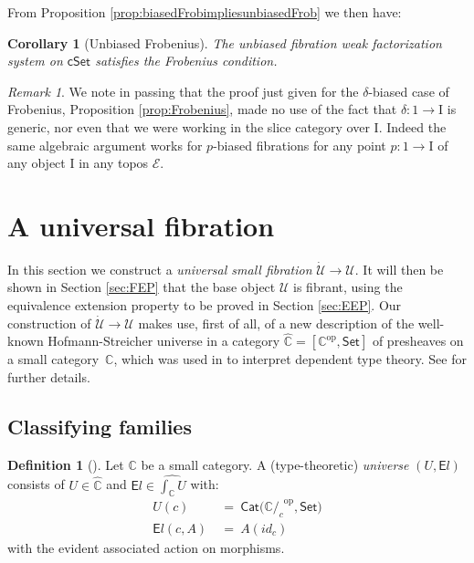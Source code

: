 \documentclass[12pt]{article}
\newcommand{\bbC}{\ensuremath{\mathbb{C}}}
\newcommand{\EE}{\ensuremath{\mathcal{E}}}
\newcommand{\Set}{\ensuremath{\mathsf{Set}}}
\newcommand{\Cat}{\ensuremath{\mathsf{Cat}}}
\newcommand{\cSet}{\ensuremath{\mathsf{cSet}}}
\newcommand{\op}[1]{\ensuremath{{#1}^{\mathrm{op}}}}
\newcommand{\ra}{\ensuremath{\rightarrow}}
\renewcommand{\to}{\ensuremath{\rightarrow}}
\newcommand{\I}{\ensuremath{\mathrm{I}}}
\newcommand{\U}{\ensuremath{\mathcal{U}}}
\newtheorem{corollary}[theorem]{Corollary}
\theoremstyle{remark}
\newtheorem{remark}[theorem]{Remark}
\theoremstyle{definition}
\newtheorem{definition}[theorem]{Definition}
\begin{document}
From Proposition \ref{prop:biasedFrobimpliesunbiasedFrob} we then have:

\begin{corollary}[Unbiased Frobenius]\label{cor:unbiasedFrobenius}
The unbiased fibration weak factorization system on $\cSet$ satisfies the Frobenius condition.
\end{corollary}

\begin{remark}\label{remark:unbiasedFrobeniusgeneralizes}
We note in passing that the proof just given for the $\delta$-biased case of Frobenius, Proposition \ref{prop:Frobenius}, made no use of the fact that $\delta : 1\to\I$ is generic, nor even that we were working in the slice category over $\I$.  Indeed the same algebraic argument works for $p$-biased fibrations for any point $p : 1\to\I$ of any object $\I$ in any topos $\EE$.
\end{remark}

\section{A universal fibration}\label{sec:U}

In this section we construct a \emph{universal small fibration} $\dot{\U}\ra \U$.  
It will then be shown  in Section \ref{sec:FEP} that the base object $\U$ is fibrant, using the equivalence extension property to be proved in Section \ref{sec:EEP}.   
Our construction of $\dot{\U}\ra \U$ makes use, first of all, of a new description of the well-known Hofmann-Streicher universe in a category $\widehat{\bbC} = [\op{\bbC}, \Set]$ of presheaves on a small category~$\bbC$, which was used in \cite{HS:1997} to interpret dependent type theory. See \cite{awodey:HSuniverse} for further details. 

\subsection{Classifying families}\label{sec:U}

\begin{definition}[\cite{HS:1997}]\label{def:HSuniverse}
Let $\bbC$ be a small category.  A (type-theoretic) \emph{universe}  $(U, {\mathsf{E}l})$  consists of 
$U\in\widehat{\bbC}$ and $\textstyle{\mathsf{E}l} \in \widehat{\int_\bbC U}$ with: 
 \begin{align}
	U(c)\ &=\ \Cat\big(\op{\bbC/_c}, \Set\big) \label{eq:universeob}\\ 
 	{\mathsf{E}l}(c, A)\ &=\ A(id_c) \label{eq:universeel}
 \end{align}
with the evident associated action on morphisms.  
\end{definition}
\end{document}
